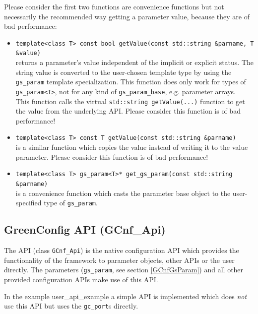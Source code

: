 Please consider the first two functions are convenience functions but not necessarily the recommended way getting a parameter value, because they are of bad performance:

\begin{itemize}
    \item \lstinline|template<class T> const bool getValue(const std::string &parname, T &value)| \\
    	returns a parameter's value independent of the implicit or explicit status. The string value is converted to the user-chosen template type by using the \lstinline|gs_param| template specialization. This function does only work for types of \lstinline|gs_param<T>|, not for any kind of \lstinline|gs_param_base|, e.g. parameter arrays. \\
	This function calls the virtual \lstinline|std::string getValue(...)| function to get the value from the underlying API. Please consider this function is of bad performance!

    \item  \lstinline|template<class T> const T getValue(const std::string &parname)| \\
    	is a similar function which copies the value instead of writing it to the value parameter. Please consider this function is of bad performance!

    \item \lstinline|template<class T> gs_param<T>* get_gs_param(const std::string &parname)| \\
    	is a convenience function which casts the parameter base object to the user-specified type of \lstinline|gs_param|.

\end{itemize}

\subsection{GreenConfig API (GCnf\_Api)}
\label{GCnf API}\label{GCnfApi}
The \GreenConfig API (class \lstinline|GCnf_Api|) is the native \GreenControl configuration API which provides the functionality of the framework to parameter objects, other APIs or the user directly. The \GreenConfig parameters (\lstinline|gs_param|, see section \ref{GCnfGsParam}) and all other provided configuration APIs make use of this API.

In the example \textsf{user\_api\_example} a simple API is implemented which does {\em not} use this API but uses the \lstinline|gc_port|s directly.

